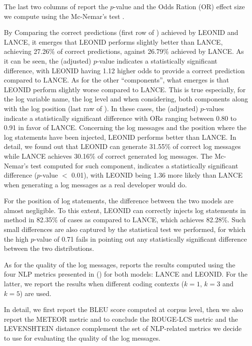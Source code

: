 The last two columns of  report the $p$-value and the Odds Ration (OR) effect size we compute using the Mc-Nemar's test \cite{mcnemar}.

By Comparing the correct predictions (\ie first row of ) achieved by LEONID and LANCE, it emerges that LEONID performs slightly better than LANCE, achieving 27.26\% of correct predictions, against 26.79\% achieved by LANCE.  As it can be seen, the (adjusted) $p$-value indicates a statistically significant difference, with LEONID having 1.12 higher odds to provide a correct prediction compared to LANCE. 
As for the other ``components'', what emerges is that LEONID perform slightly worse compared to LANCE.
This is true especially, for the log variable name, the log level and when considering, both components along with the log position (\ie last raw of ). 
In these cases, the (adjusted) $p$-values indicate a statistically significant difference with ORs ranging between 0.80 to 0.91 in favor of LANCE.  Concerning the log messages and the position where the log statements have been injected, LEONID performs better than LANCE.
In detail, we found out that LEONID can generate 31.55\% of correct log messages while LANCE achieves 30.16\% of correct generated log messages. The Mc-Nemar's test computed for such component, indicates a statistically significant difference ($p$-value $<$ 0.01), with LEONID being 1.36 more likely than LANCE when generating a log messages as a real developer would do.

For the position of log statements, the difference between the two models are almost negligible. To this extent, LEONID can correctly injects log statements in \java method in 82.35\% of cases as compared to LANCE, which achieves 82.28\%. Such small differences are also captured by the statistical test we performed, for which the high $p$-value of 0.71 fails in pointing out any statistically significant difference between the two distributions.

As for the quality of the log messages,  reports the results computed using the four NLP metrics presented in () for both models: LANCE and LEONID. For the latter, we report the results when different coding contexts (\ie $k=1$, $k=3$ and $k=5$) are used. 

In detail, we first report the BLEU score computed at corpus level, then we also report the METEOR metric and to conclude the ROUGE-LCS metric and the LEVENSHTEIN distance complement the set of NLP-related metrics we decide to use for evaluating the quality of the log messages.

